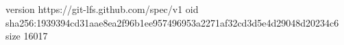 version https://git-lfs.github.com/spec/v1
oid sha256:1939394cd31aae8ea2f96b1ee957496953a2271af32cd3d5e4d29048d20234c6
size 16017
